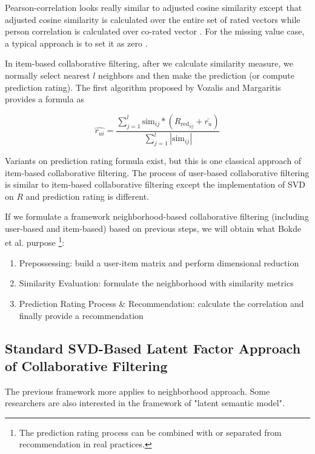 \documentclass[letter paper, 11pt]{article}
\begin{document}
	Pearson-correlation looks really similar to adjusted cosine similarity except that adjusted cosine similarity is calculated over the entire set of rated vectors while person correlation is calculated over co-rated vector \cite{sim}. For the missing value case, a typical approach is to set it as zero \cite{new-sim}.

	In item-based collaborative filtering, after we calculate similarity measure, we normally select nearest $l$ neighbors and then make the prediction (or compute prediction rating). The first algorithm proposed by Vozalis and Margaritis \cite{ApplySVD} provides a formula as
	
	\begin{equation}
		\hat{r_{ui}} = \dfrac{\sum_{j = 1}^{l} \text{sim}_{ij} * (R_{\text{red}_{uj}} + \bar{r_u})}{\sum_{j=1}^{l} |\text{sim}_{ij}|}
	\end{equation}

	Variants on prediction rating formula exist, but this is one classical approach of item-based collaborative filtering. The process of user-based collaborative filtering is similar to item-based collaborative filtering except the implementation of SVD on $R$ and prediction rating is different. 
	
	If we formulate a framework neighborhood-based collaborative filtering (including user-based and item-based) based on previous steps, we will obtain what Bokde et al. purpose \cite{MF-Model-Survey}\footnote{The prediction rating process can be combined with or separated from recommendation in real practices.}:
	
	\begin{enumerate}
		\item Prepossessing:
		build a user-item matrix and perform dimensional reduction
		
		\item Similarity Evaluation:
		formulate the neighborhood with similarity metrics
		
		\item Prediction Rating Process \& Recommendation:
		calculate the correlation and finally provide a recommendation
	\end{enumerate}
	
	\subsection{Standard SVD-Based Latent Factor Approach of Collaborative Filtering} 
	The previous framework more applies to neighborhood approach. Some researchers are also interested in the framework of "latent semantic model". 
	
\end{document}
